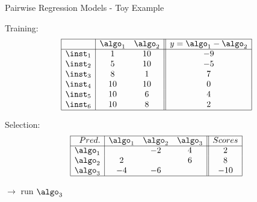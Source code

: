 \begin{frame}[c]{Pairwise Regression Models - Toy Example}

Training:
\[
\begin{array}{| r | c  c  || c |}
  \cline{1-4}
      & \algo_1 & \algo_2 & y = \algo_1 - \algo_2\\
  \cline{1-4}
  \inst_1 & 		 1    &         10  &  -9 \\
  \inst_2 &          5    &         10  &  -5\\
  \inst_3 &          8    &  		1   & 7\\
  \inst_4 &         10  &           10  & 0\\
  \inst_5 &         10  & 		    6   & 4\\
  \inst_6 &         10  &           8   & 2\\
  \cline{1-4}
\end{array}
\]

\pause

Selection:
\[
\begin{array}{| r | c  c  c || c |}
  \cline{1-5}
  Pred.    & \algo_1 & \algo_2 & \algo_3 & Scores\\
  \cline{1-5}
  \algo_1 &      & -2  &  4  & 2\\
  \algo_2 &  2    &   &  6  & 8\\
  \algo_3 &  -4    & -6  &    & -10\\
  \cline{1-5}
\end{array}
\]

\centering
$\to$ run $\algo_3$

\end{frame}
